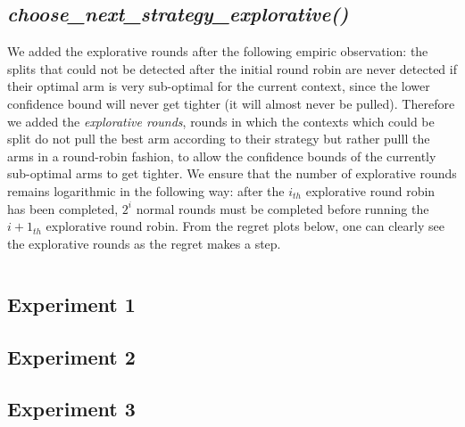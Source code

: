 \documentclass[11pt]{article} %
\begin{document}
\begin{samepage}
\subsection{\textit{choose\_next\_strategy\_explorative()}}
We added the explorative rounds after the following empiric observation: the splits that could not be detected after the initial round robin are never detected if their optimal arm is very sub-optimal for the current context, since the lower confidence bound will never get tighter (it will almost never be pulled). Therefore we added the \textit{explorative rounds}, rounds in which the contexts which could be split do not pull the best arm according to their strategy but rather pulll the arms in a round-robin fashion, to allow the confidence bounds of the currently sub-optimal arms to get tighter. We ensure that the number of explorative rounds remains logarithmic in the following way: after the $i_{th}$ explorative round robin has been completed, $2^i$ normal rounds must be completed before running the $i+1_{th}$ explorative round robin. From the regret plots below, one can clearly see the explorative rounds as the regret makes a step.

\inputminted{python}{code/step4_choose_next_strategy_explorative.py}
\end{samepage}

\clearpage
\subsection{Experiment 1}

\clearpage

{\footnotesize}

\clearpage
\subsection{Experiment 2}

\clearpage

{\footnotesize}

\clearpage
\subsection{Experiment 3}
\end{document}
